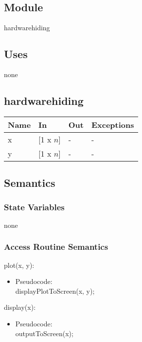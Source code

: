 \documentclass[12pt, titlepage]{article}
\begin{document}

\subsection{Module}
hardwarehiding

\subsection{Uses}

none

\subsection{hardwarehiding}

\begin{center}
\begin{tabular}{p{4cm} p{4cm} p{4cm} p{2cm}}
\hline
\textbf{Name} & \textbf{In} & \textbf{Out} & \textbf{Exceptions} \\
\hline
x & [1 x $n$] & - & - \\
y & [1 x $n$] & - & - \\
\hline
\end{tabular}
\end{center}

\subsection{Semantics}

\subsubsection{State Variables}
none

\subsubsection{Access Routine Semantics}
plot(x, y):
\begin{itemize}
\item Pseudocode:\\
displayPlotToScreen(x, y); 
\end{itemize}
display(x):
\begin{itemize}
\item Pseudocode:\\
outputToScreen(x); 
\end{itemize}
\end{document}
